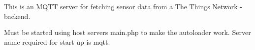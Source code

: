 This is an M\+Q\+TT server for fetching sensor data from a The Things Network -\/backend.

Must be started using host server\textquotesingle{}s main.\+php to make the autoloader work. Server name required for start up is mqtt. 